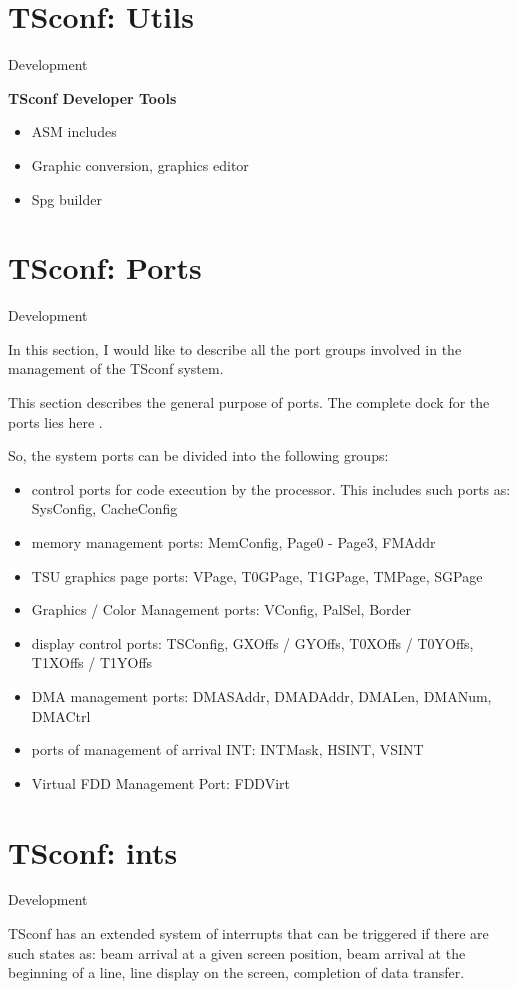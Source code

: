 \documentclass{article}
\begin{document}
\section*{TSconf: Utils}
Development

\textbf{TSconf Developer Tools}

\begin{itemize}
\item ASM includes
\item Graphic conversion, graphics editor
\item Spg builder
\end{itemize}
\section*{TSconf: Ports}
Development

In this section, I would like to describe all the port groups involved
in the management of the TSconf system.

This section describes the general purpose of ports. The complete dock
for the ports lies here .

So, the system ports can be divided into the following groups:
\begin{itemize}
\item control ports for code execution by the processor. This includes
  such ports as: SysConfig, CacheConfig
\item memory management ports: MemConfig, Page0 - Page3, FMAddr
\item TSU graphics page ports: VPage, T0GPage, T1GPage, TMPage, SGPage
\item Graphics / Color Management ports: VConfig, PalSel, Border
\item display control ports: TSConfig, GXOffs / GYOffs, T0XOffs /
  T0YOffs, T1XOffs / T1YOffs
\item DMA management ports: DMASAddr, DMADAddr, DMALen, DMANum,
  DMACtrl
\item ports of management of arrival INT: INTMask, HSINT, VSINT
\item Virtual FDD Management Port: FDDVirt
\end{itemize}
\section*{TSconf: ints}
Development

TSconf has an extended system of interrupts that can be triggered if
there are such states as: beam arrival at a given screen position,
beam arrival at the beginning of a line, line display on the screen,
completion of data transfer.
\end{document}
